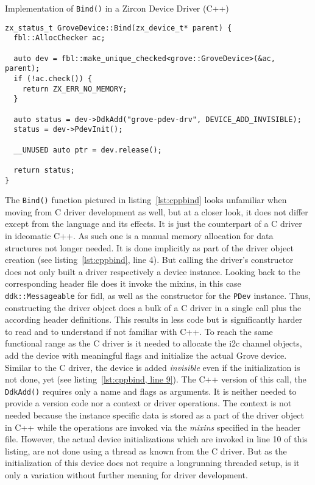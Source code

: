 \begin{listing} [H]
    \caption{Implementation of \texttt{Bind()} in a Zircon Device Driver (C++)}
\label{lst:cppbind}
\begin{verbatim}
zx_status_t GroveDevice::Bind(zx_device_t* parent) {
  fbl::AllocChecker ac;

  auto dev = fbl::make_unique_checked<grove::GroveDevice>(&ac, parent);
  if (!ac.check()) {
    return ZX_ERR_NO_MEMORY;
  }

  auto status = dev->DdkAdd("grove-pdev-drv", DEVICE_ADD_INVISIBLE);
  status = dev->PdevInit();

  __UNUSED auto ptr = dev.release();

  return status;
}
\end{verbatim}
\end{listing}

The \texttt{Bind()} function pictured in listing~\ref{lst:cppbind} looks unfamiliar when moving from C driver development as well, but at a closer look, it does not differ except from the language and its effects.
It is just the counterpart of a C driver in ideomatic C++.
As such one is a manual memory allocation for data structures not longer needed.
It is done implicitly as part of the driver object creation (see listing~\ref{lst:cppbind}, line 4).
But calling the driver's constructor does not only built a driver respectively a device instance.
Looking back to the corresponding header file does it invoke the mixins, in this case \texttt{ddk::Messageable} for \ac{fidl}, as well as the constructor for the \texttt{PDev} instance.
Thus, constructing the driver object does a bulk of a C driver in a single call plus the according header definitions.
This results in less code but is significantly harder to read and to understand if not familiar with C++.
To reach the same functional range as the C driver is it needed to allocate the \ac{i2c} channel objects, add the device with meaningful flags and initialize the actual Grove device.
Similar to the C driver, the device is added \textit{invisible} even if the initialization is not done, yet (see listing~\ref{lst:cppbind, line 9}).
The C++ version of this call, the \texttt{DdkAdd()} requires only a name and flags as arguments.
It is neither needed to provide a version code nor a context or driver operations.
The context is not needed because the instance specific data is stored as a part of the driver object in C++ while the operations are invoked via the \textit{mixins} specified in the header file.
However, the actual device initializations which are invoked in line 10 of this listing, are not done using a thread as known from the C driver.
But as the initialization of this device does not require a longrunning threaded setup, is it only a variation without further meaning for driver development. 


